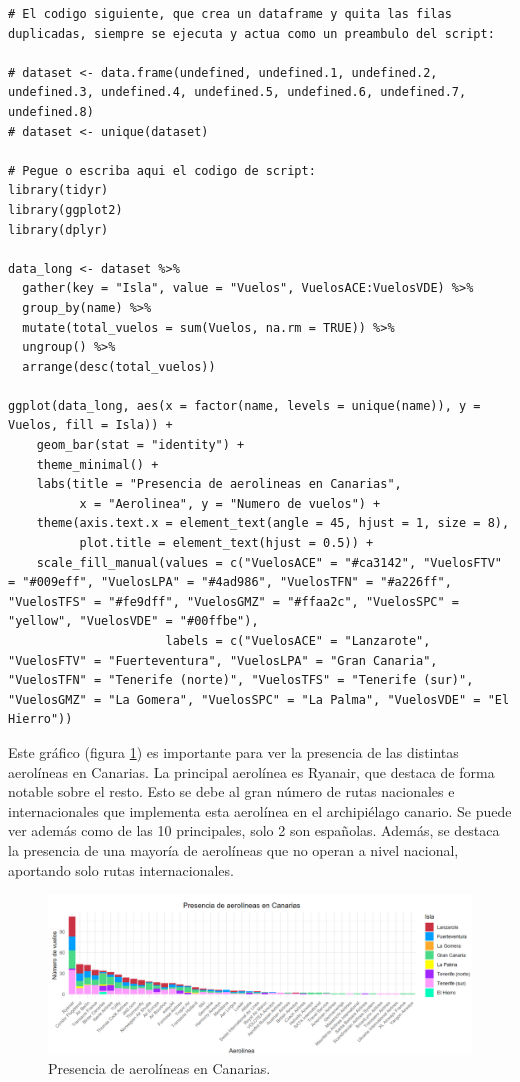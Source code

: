 \documentclass[11pt]{opticajnl}
\begin{document}
\begin{lstlisting}[style=R]
# El codigo siguiente, que crea un dataframe y quita las filas duplicadas, siempre se ejecuta y actua como un preambulo del script:

# dataset <- data.frame(undefined, undefined.1, undefined.2, undefined.3, undefined.4, undefined.5, undefined.6, undefined.7, undefined.8)
# dataset <- unique(dataset)
  
# Pegue o escriba aqui el codigo de script:
library(tidyr)
library(ggplot2)
library(dplyr)
  
data_long <- dataset %>%
  gather(key = "Isla", value = "Vuelos", VuelosACE:VuelosVDE) %>%
  group_by(name) %>%
  mutate(total_vuelos = sum(Vuelos, na.rm = TRUE)) %>%
  ungroup() %>%
  arrange(desc(total_vuelos))

ggplot(data_long, aes(x = factor(name, levels = unique(name)), y = Vuelos, fill = Isla)) +
    geom_bar(stat = "identity") +
    theme_minimal() +
    labs(title = "Presencia de aerolineas en Canarias",
          x = "Aerolinea", y = "Numero de vuelos") +
    theme(axis.text.x = element_text(angle = 45, hjust = 1, size = 8),
          plot.title = element_text(hjust = 0.5)) +
    scale_fill_manual(values = c("VuelosACE" = "#ca3142", "VuelosFTV" = "#009eff", "VuelosLPA" = "#4ad986", "VuelosTFN" = "#a226ff", "VuelosTFS" = "#fe9dff", "VuelosGMZ" = "#ffaa2c", "VuelosSPC" = "yellow", "VuelosVDE" = "#00ffbe"),
                      labels = c("VuelosACE" = "Lanzarote", "VuelosFTV" = "Fuerteventura", "VuelosLPA" = "Gran Canaria", "VuelosTFN" = "Tenerife (norte)", "VuelosTFS" = "Tenerife (sur)", "VuelosGMZ" = "La Gomera", "VuelosSPC" = "La Palma", "VuelosVDE" = "El Hierro"))  
\end{lstlisting}

Este gráfico (figura \ref{fig:barras}) es importante para ver la presencia de las distintas aerolíneas en Canarias. La principal aerolínea es Ryanair, que destaca de forma notable sobre el resto. Esto se debe al gran número de rutas nacionales e internacionales que implementa esta aerolínea en el archipiélago canario. Se puede ver además como de las 10 principales, solo 2 son españolas. Además, se destaca la presencia de una mayoría de aerolíneas que no operan a nivel nacional, aportando solo rutas internacionales.

\begin{figure}[h]
\centering
\includegraphics[width=\textwidth]{fotos/barras.png}
\caption{Presencia de aerolíneas en Canarias.}
\label{fig:barras}
\end{figure}
\end{document}

